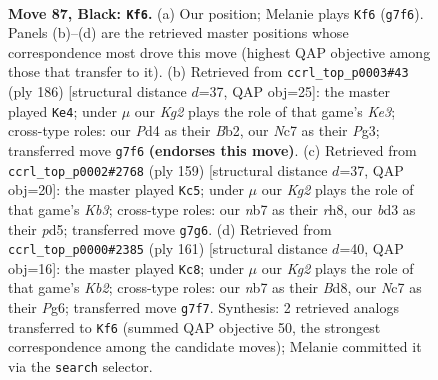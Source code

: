 \documentclass[11pt]{article}
\begin{document}
\clearpage

\begin{figure}[p]\centering
\begin{subfigure}{0.46\textwidth}\centering
\resizebox{\linewidth}{!}{%
\newchessgame
\chessboard[
  setfen={8/1Nn3k1/8/p7/Pb1pP2n/1P1B3p/4P3/2K5 b - - 41 87},
  showmover=false,
  pgfstyle=straightmove, color=movearrow, markmove={g7-f6}
]}
\caption{}
\end{subfigure}\hfill
\begin{subfigure}{0.46\textwidth}\centering
\resizebox{\linewidth}{!}{%
\newchessgame
\chessboard[
  setfen={5k2/1B3p2/Pb4p1/2p1P2p/2b4P/4K1P1/1B6/8 w - - 63 94},
  showmover=false,
  pgfstyle=straightmove, color=movearrow, markmove={e3-e4}
]}
\caption{}
\end{subfigure}
\\[4pt]
\begin{subfigure}{0.46\textwidth}\centering
\resizebox{\linewidth}{!}{%
\newchessgame
\chessboard[
  setfen={7R/8/1k1p4/3Pp2p/4P1bP/r7/5KB1/8 b - - 58 80},
  showmover=false,
  pgfstyle=straightmove, color=movearrow, markmove={b6-c5}
]}
\caption{}
\end{subfigure}\hfill
\begin{subfigure}{0.46\textwidth}\centering
\resizebox{\linewidth}{!}{%
\newchessgame
\chessboard[
  setfen={3b4/1k5p/6pP/1p1pPpP1/1P1P4/4B1K1/8/8 b - - 15 81},
  showmover=false,
  pgfstyle=straightmove, color=movearrow, markmove={b7-c8}
]}
\caption{}
\end{subfigure}
\caption{\textbf{Move 87, Black: \texttt{Kf6}.} (a) Our position; Melanie plays \texttt{Kf6} (\texttt{g7f6}). Panels (b)--(d) are the retrieved master positions whose correspondence most drove this move (highest QAP objective among those that transfer to it). (b) Retrieved from \texttt{ccrl\_top\_p0003\#43} (ply 186) [structural distance $d$=37, QAP obj=25]: the master played \texttt{Ke4}; under $\mu$ our \emph{Kg2} plays the role of that game's \emph{Ke3}; cross-type roles: our \emph{P}d4 as their \emph{B}b2, our \emph{N}c7 as their \emph{P}g3; transferred move \texttt{g7f6} \textbf{(endorses this move)}. (c) Retrieved from \texttt{ccrl\_top\_p0002\#2768} (ply 159) [structural distance $d$=37, QAP obj=20]: the master played \texttt{Kc5}; under $\mu$ our \emph{Kg2} plays the role of that game's \emph{Kb3}; cross-type roles: our \emph{n}b7 as their \emph{r}h8, our \emph{b}d3 as their \emph{p}d5; transferred move \texttt{g7g6}. (d) Retrieved from \texttt{ccrl\_top\_p0000\#2385} (ply 161) [structural distance $d$=40, QAP obj=16]: the master played \texttt{Kc8}; under $\mu$ our \emph{Kg2} plays the role of that game's \emph{Kb2}; cross-type roles: our \emph{n}b7 as their \emph{B}d8, our \emph{N}c7 as their \emph{P}g6; transferred move \texttt{g7f7}. Synthesis: 2 retrieved analogs transferred to \texttt{Kf6} (summed QAP objective 50, the strongest correspondence among the candidate moves); Melanie committed it via the \texttt{search} selector.}
\label{fig:thought-m173}
\end{figure}
\end{document}
